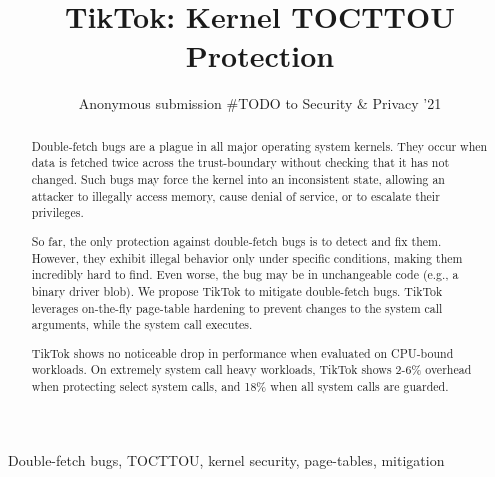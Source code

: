 \documentclass[conference]{IEEEtran}
\newcommand{\sysname}{TikTok}
\newcommand{\roughevaloverheadbad}{18\%}
\newcommand{\roughevaloverheadbetter}{2-6\%}
\begin{document}

\date{}

\title{\Large \bf TikTok: Kernel TOCTTOU Protection}

\author{
Anonymous submission \#TODO to Security \& Privacy '21
} %

\maketitle

\begin{abstract}

Double-fetch bugs are a plague in all major operating system kernels.  They
occur when data is fetched twice across the trust-boundary without checking that
it has not changed. Such bugs may force the kernel into an inconsistent state,
allowing an attacker to illegally access memory, cause denial of service, or to
escalate their privileges.

So far, the only protection against double-fetch bugs is to detect and fix them.
However, they exhibit illegal behavior only under specific conditions, making
them incredibly hard to find. Even worse, the bug may be in unchangeable code
(e.g., a binary driver blob).
%
We propose \sysname{} to mitigate double-fetch bugs.  \sysname{} leverages
on-the-fly page-table hardening to prevent changes to the system call arguments,
while the system call executes.


\sysname{} shows no noticeable drop in performance when evaluated on CPU-bound
workloads. On extremely system call heavy workloads, \sysname{} shows
\roughevaloverheadbetter{} overhead when protecting select system calls, and
\roughevaloverheadbad{} when all system calls are guarded.


\end{abstract}

\begin{IEEEkeywords}
Double-fetch bugs, TOCTTOU, kernel security, page-tables, mitigation
\end{IEEEkeywords}
\end{document}
